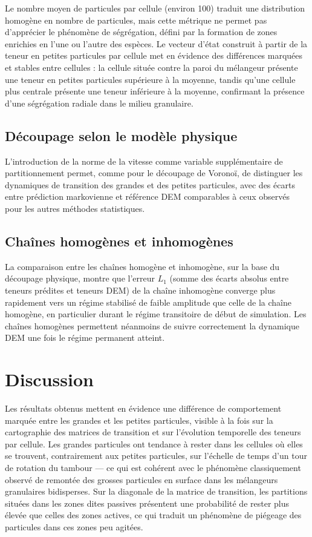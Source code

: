 \documentclass{MemoireMaster}
\begin{document}
Le nombre moyen de particules par cellule (environ 100) traduit une distribution homogène en nombre de particules, mais cette métrique ne permet pas d'apprécier le phénomène de ségrégation, défini par la formation de zones enrichies en l'une ou l'autre des espèces. Le vecteur d'état construit à partir de la teneur en petites particules par cellule met en évidence des différences marquées et stables entre cellules : la cellule située contre la paroi du mélangeur présente une teneur en petites particules supérieure à la moyenne, tandis qu'une cellule plus centrale présente une teneur inférieure à la moyenne, confirmant la présence d'une ségrégation radiale dans le milieu granulaire.

\subsection{Découpage selon le modèle physique}
L'introduction de la norme de la vitesse comme variable supplémentaire de partitionnement permet, comme pour le découpage de Voronoï, de distinguer les dynamiques de transition des grandes et des petites particules, avec des écarts entre prédiction markovienne et référence DEM comparables à ceux observés pour les autres méthodes statistiques.

\subsection{Chaînes homogènes et inhomogènes}
La comparaison entre les chaînes homogène et inhomogène, sur la base du découpage physique, montre que l'erreur $L_1$ (somme des écarts absolus entre teneurs prédites et teneurs DEM) de la chaîne inhomogène converge plus rapidement vers un régime stabilisé de faible amplitude que celle de la chaîne homogène, en particulier durant le régime transitoire de début de simulation. Les chaînes homogènes permettent néanmoins de suivre correctement la dynamique DEM une fois le régime permanent atteint.

\section{Discussion}
Les résultats obtenus mettent en évidence une différence de comportement marquée entre les grandes et les petites particules, visible à la fois sur la cartographie des matrices de transition et sur l'évolution temporelle des teneurs par cellule. Les grandes particules ont tendance à rester dans les cellules où elles se trouvent, contrairement aux petites particules, sur l'échelle de temps d'un tour de rotation du tambour --- ce qui est cohérent avec le phénomène classiquement observé de remontée des grosses particules en surface dans les mélangeurs granulaires bidisperses. Sur la diagonale de la matrice de transition, les partitions situées dans les zones dites passives présentent une probabilité de rester plus élevée que celles des zones actives, ce qui traduit un phénomène de piégeage des particules dans ces zones peu agitées.
\end{document}
